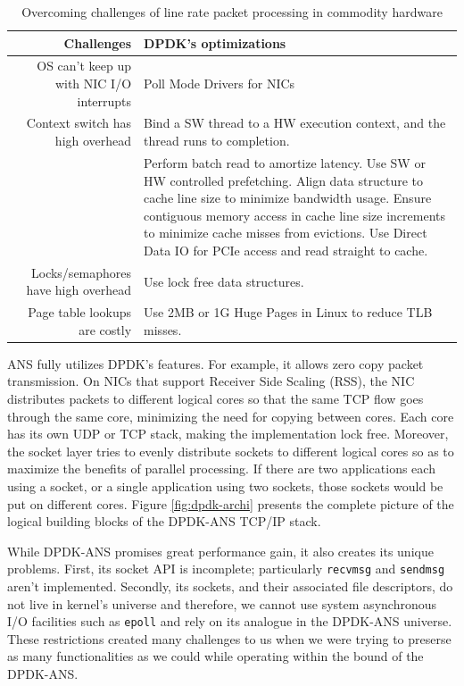 \documentclass{sig-alternate-05-2015}
\begin{document}
\begin{table}[ht]
\centering
\caption{Overcoming challenges of line rate packet processing in commodity hardware}
\label{tab:dpdkchallenges}
\begin{tabular}{|r|p{4in}|}
\hline
\textbf{Challenges} & \textbf{DPDK's optimizations}                                                           \\ \hline
OS can't keep up with NIC I/O interrupts & Poll Mode Drivers for NICs                                                                    \\ \hline
Context switch has high overhead & Bind a SW thread to a HW execution context, and the thread runs to completion.                               \\ \hline
\centering{Memory \& PCIe access is slow} & Perform batch read to amortize latency. Use SW or HW controlled prefetching. Align data structure to cache line size to minimize bandwidth usage. Ensure contiguous memory access in cache line size increments to minimize cache misses from evictions. Use Direct Data IO for PCIe access and read straight to cache.\\ \hline
Locks/semaphores have high overhead & Use lock free data structures. \\ \hline
Page table lookups are costly & Use 2MB or 1G Huge Pages in Linux to reduce TLB misses. \\ \hline
\end{tabular}
\end{table}

ANS fully utilizes DPDK's features. For example, it allows zero copy packet transmission. On NICs that support Receiver Side Scaling (RSS), the NIC distributes packets to different logical cores so that the same TCP flow goes through the same core, minimizing the need for copying between cores. Each core has its own UDP or TCP stack, making the implementation lock free. Moreover, the socket layer tries to evenly distribute sockets to different logical cores so as to maximize the benefits of parallel processing. If there are two applications each using a socket, or a single application using two sockets, those sockets would be put on different cores. Figure \ref{fig:dpdk-archi} presents the complete picture of the logical building blocks of the DPDK-ANS TCP/IP stack. \cite{dpdkans:readme}
 
While DPDK-ANS promises great performance gain, it also creates its unique problems. First, its socket API is incomplete; particularly \texttt{recvmsg} and \texttt{sendmsg} aren't implemented. Secondly, its sockets, and their associated file descriptors, do not live in kernel's universe and therefore, we cannot use system asynchronous I/O facilities such as \texttt{epoll} and rely on its analogue in the DPDK-ANS universe. These restrictions created many challenges to us when we were trying to preserse as many functionalities as we could while operating within the bound of the DPDK-ANS.
\end{document}
